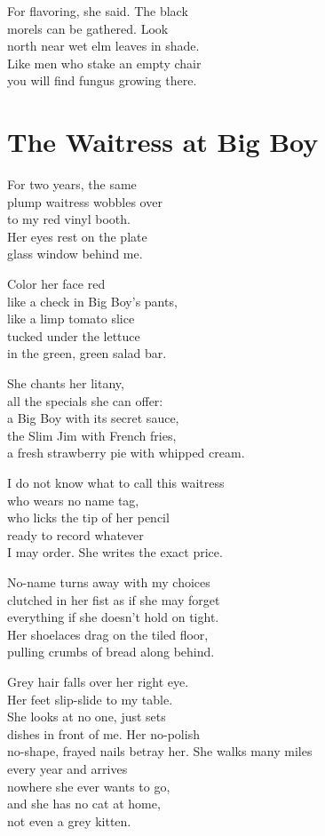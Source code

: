 \documentclass[twoside,10pt]{book}
\begin{document}
For flavoring, she said. The black\\
morels can be gathered. Look\\
north near wet elm leaves in shade.\\
Like men who stake an empty chair\\
you will find fungus growing there.


\clearpage
\section{The Waitress at Big Boy}

For two years, the same\\
plump waitress wobbles over\\
to my red vinyl booth.\\
Her eyes rest on the plate\\
glass window behind me.

Color her face red\\
like a check in Big Boy's pants,\\
like a limp tomato slice\\
tucked under the lettuce\\
in the green, green salad bar.

She chants her litany,\\
all the specials she can offer:\\
a Big Boy with its secret sauce,\\
the Slim Jim with French fries,\\
a fresh strawberry pie with whipped cream.

I do not know what to call this waitress\\
who wears no name tag,\\
who licks the tip of her pencil\\
ready to record whatever\\
I may order. She writes the exact price.

No-name turns away with my choices\\
clutched in her fist as if she may forget\\
everything if she doesn't hold on tight.\\
Her shoelaces drag on the tiled floor,\\
pulling crumbs of bread along behind.

Grey hair falls over her right eye.\\
Her feet slip-slide to my table.\\
She looks at no one, just sets\\
dishes in front of me. Her no-polish\\
no-shape, frayed nails betray her.
\clearpage
She walks many miles\\
every year and arrives\\
nowhere she ever wants to go,\\
and she has no cat at home,\\
not even a grey kitten.
\end{document}
